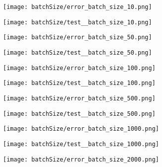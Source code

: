 \documentclass{article}
\begin{document}
\newpage
\begin{figure}[!htb]
  \centering
  \texttt{[image: batchSize/error\_batch\_size\_10.png]}
\end{figure}

\begin{figure}[!htb]
  \centering
  \texttt{[image: batchSize/test\_\_batch\_size\_10.png]}
\end{figure}

\begin{figure}[]
  \centering
  \texttt{[image: batchSize/error\_batch\_size\_50.png]}
\end{figure}

\begin{figure}[]
  \centering
  \texttt{[image: batchSize/test\_\_batch\_size\_50.png]}
\end{figure}

\begin{figure}[]
  \centering
  \texttt{[image: batchSize/error\_batch\_size\_100.png]}
\end{figure}

\begin{figure}[]
  \centering
  \texttt{[image: batchSize/test\_\_batch\_size\_100.png]}
\end{figure}

\begin{figure}[]
  \centering
  \texttt{[image: batchSize/error\_batch\_size\_500.png]}
\end{figure}

\begin{figure}[]
  \centering
  \texttt{[image: batchSize/test\_\_batch\_size\_500.png]}
\end{figure}

\begin{figure}[]
  \centering
  \texttt{[image: batchSize/error\_batch\_size\_1000.png]}
\end{figure}

\begin{figure}[]
  \centering
  \texttt{[image: batchSize/test\_\_batch\_size\_1000.png]}
\end{figure}

\begin{figure}[]
  \centering
  \texttt{[image: batchSize/error\_batch\_size\_2000.png]}
\end{figure}
\end{document}
